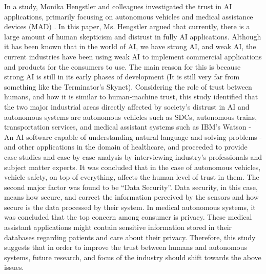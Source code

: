 \documentclass[runningheads,a4paper]{llncs}
\begin{document}
In a study, Monika Hengstler and colleagues investigated the trust in AI applications, primarily focusing on autonomous vehicles and medical assistance devices (MAD) \cite{hengstler2016applied}. In this paper, Ms. Hengstler argued that currently, there is a large amount of human skepticism and distrust in fully AI applications. Although it has been known that in the world of AI, we have strong AI, and weak AI, the current industries have been using weak AI to implement commercial applications and products for the consumers to use. The main reason for this is because strong AI is still in its early phases of development (It is still very far from something like the Terminator's Skynet). Considering the role of trust between humans, and how it is similar to human-machine trust, this study identified that the two major industrial areas directly affected by society's distrust in AI and autonomous systems are autonomous vehicles such as SDCs, autonomous trains, transportation services, and medical assistant systems such as IBM's Watson - An AI software capable of understanding natural language and solving problems - and other applications in the domain of healthcare, and proceeded to provide case studies and case by case analysis by interviewing industry's professionals and subject matter experts. It was concluded that in the case of autonomous vehicles, vehicle safety, on top of everything, affects the human level of trust in them. The second major factor was found to be ``Data Security''. Data security, in this case, means how secure, and correct the information perceived by the sensors and how secure is the data processed by their system. In medical autonomous systems, it was concluded that the top concern among consumer is privacy. These medical assistant applications might contain sensitive information stored in their databases regarding patients and care about their privacy. Therefore, this study suggests that in order to improve the trust between humans and autonomous systems, future research, and focus of the industry should shift towards the above issues.
\end{document}
